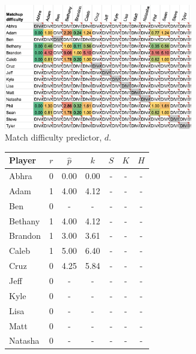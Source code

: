 \documentclass[letterpaper, 10 pt, conference]{ieeeconf}  %
\begin{document}
\begin{figure}[h!b]
        \begin{subfigure}[hb]{0.5\textwidth}
        \includegraphics[width=0.9\textwidth]{fig/difficulty_1.png}
        \caption{Match difficulty predictor, $d$.}
        \end{subfigure}
        \begin{subfigure}[hb]{0.4\textwidth}
                \footnotesize
                \centering
                \begin{tabular}{lccc|ccc}
                        \toprule
                        Player  & $r$   & $\hat{p}$ & $k$ & $S$ & $K$ & $H$\\
                        \midrule
                        Abhra	& 0	& 0.00	& 0.00 & - & - & - \\
                        Adam	& 1	& 4.00	& 4.12 & - & - & - \\
                        Ben	& 0	& -	& -    & - & - & - \\
                        Bethany	& 1	& 4.00	& 4.12 & - & - & - \\
                        Brandon	& 1	& 3.00	& 3.61 & - & - & - \\
                        Caleb	& 1	& 5.00	& 6.40 & - & - & - \\
                        Cruz	& 0	& 4.25	& 5.84 & - & - & - \\
                        Jeff	& 0	& -	& -    & - & - & - \\
                        Kyle	& 0	& -  	& -    & - & - & - \\
                        Lisa	& 0	& -  	& -    & - & - & - \\
                        Matt	& 0	& -  	& -    & - & - & - \\
                        Natasha	& 0	& -  	& -    & - & - & - \\

\end{tabular}
\end{subfigure}
\end{figure}
\end{document}

